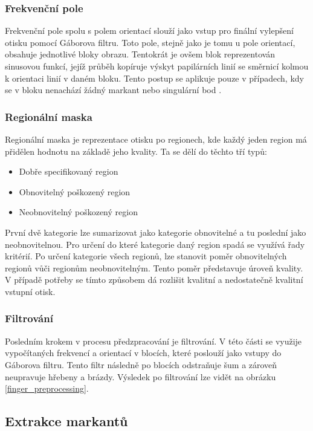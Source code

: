 \subsubsection{Frekvenční pole}
Frekvenční pole spolu s polem orientací slouží jako vstup pro finální vylepšení otisku pomocí Gáborova filtru. Toto pole, stejně jako je tomu u pole orientací, obsahuje jednotlivé bloky obrazu. Tentokrát je ovšem blok reprezentován sinusovou funkcí, jejíž průběh kopíruje výskyt papilárních linií se směrnicí kolmou k orientaci linií v daném bloku. Tento postup se aplikuje pouze v případech, kdy se v bloku nenachází žádný markant nebo singulární bod \cite{otiskyPrstu}.

\subsubsection{Regionální maska}
Regionální maska je reprezentace otisku po regionech, kde každý jeden region má přidělen hodnotu na základě jeho kvality. Ta se dělí do těchto tří typů:


\begin{itemize}
    \item Dobře specifikovaný region
    \item Obnovitelný poškozený region
    \item Neobnovitelný poškozený region
\end{itemize}

První dvě kategorie lze sumarizovat jako kategorie obnovitelné a tu poslední jako neobnovitelnou. Pro určení do které kategorie daný region spadá se využívá řady kritérií. Po určení kategorie všech regionů, lze stanovit poměr obnovitelných regionů vůči regionům neobnovitelným. Tento poměr představuje úroveň kvality. V případě potřeby se tímto způsobem dá rozlišit kvalitní a nedostatečně kvalitní vstupní otisk.

\subsubsection{Filtrování}
Posledním krokem v procesu předzpracování je filtrování. V této části se využije vypočítaných frekvencí a orientací v blocích, které poslouží jako vstupy do Gáborova filtru. Tento filtr následně po blocích odstraňuje šum a zároveň neupravuje hřebeny a brázdy. Výsledek po filtrování lze vidět na obrázku \ref{finger_preprocessing}.


\subsection{Extrakce markantů}
\label{Extrakce markantů}

